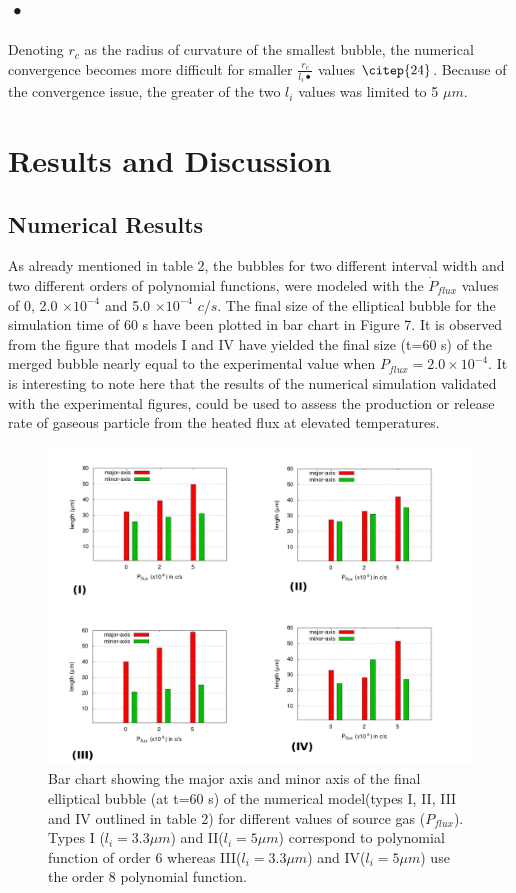 \documentclass[10pt,a4paper]{article}
\begin{document}
\subsection*{•}
 Denoting $r_c$ as the radius of curvature of the smallest bubble, the numerical convergence becomes more difficult for smaller $\frac{r_c}{l_i•}$ values $\citep{24}$. Because of the convergence issue, the greater of the two $l_i$ values was limited to 5 $\mu m$. 

\section{Results and Discussion}

\subsection{Numerical Results}
As already mentioned in table 2, the bubbles for two different interval width and two different orders of polynomial functions, were modeled with the $\dot P_{flux}$ values of 0, 2.0 $\times 10 ^{-4}$ and 5.0 $\times 10 ^{-4}$ $c/s$. The final size of the elliptical bubble for the simulation time of 60 s have been plotted in bar chart in Figure 7. It is observed from the figure that models I and IV have yielded the final size (t=60 s) of the merged bubble nearly equal to the experimental value when $P_{flux} = 2.0 \times 10 ^{-4}$.   It is interesting to note here that the results of the numerical simulation validated with the experimental figures, could be used to assess the production or release rate of  gaseous particle from the heated flux at elevated temperatures.
\begin{figure}
\caption{Bar chart showing the major axis and minor axis of the final elliptical bubble (at t=60 s) of the numerical model(types I, II, III and IV outlined in table 2) for different values of source gas ($P_{flux}$). Types I ($l_{i}=3.3 \mu m$) and II($l_{i}=5 \mu m$) correspond to polynomial function of order 6 whereas III($l_{i}=3.3 \mu m$) and IV($l_{i}=5 \mu m$) use the order 8 polynomial function.}
\centering
   \includegraphics[scale=0.25]{Bubble60}
\end{figure}  
\end{document}
